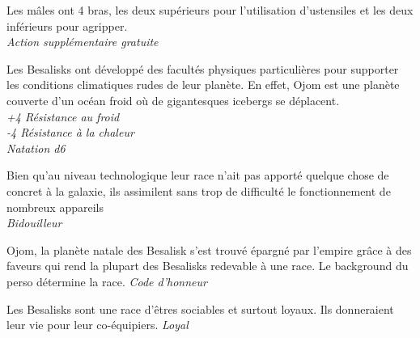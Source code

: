 \begin{description}[align=left]
\item [A bras le corps]         %
    Les mâles ont 4 bras, les deux supérieurs pour l’utilisation d’ustensiles et les deux inférieurs pour agripper.\\
    \emph{Action supplémentaire gratuite}

\item [Pas frileux]             %
    Les Besalisks ont développé des facultés physiques particulières pour supporter les conditions climatiques rudes de leur planète. En effet, Ojom est une planète couverte d’un océan froid où de gigantesques icebergs se déplacent.\\
    \emph{+4 Résistance au froid}\\
    \emph{-4 Résistance à la chaleur}\\
    \emph{Natation d6}

\item [Bricoleur]               %
    Bien qu'au niveau technologique leur race n’ait pas apporté quelque chose de concret à la galaxie, ils assimilent sans trop de difficulté le fonctionnement de nombreux appareils\\
    \emph{Bidouilleur}

\item [Dette de Libertè]        %
    Ojom, la planète natale des Besalisk s’est trouvé épargné par l’empire grâce à des faveurs qui rend la plupart des Besalisks redevable à une race. Le background du perso détermine la race.
    \emph{Code d’honneur}

\item [Loyal]                   %
    Les Besalisks sont une race d’êtres sociables et surtout loyaux. Ils donneraient leur vie pour leur co-équipiers.
    \emph{Loyal}
\end{description}